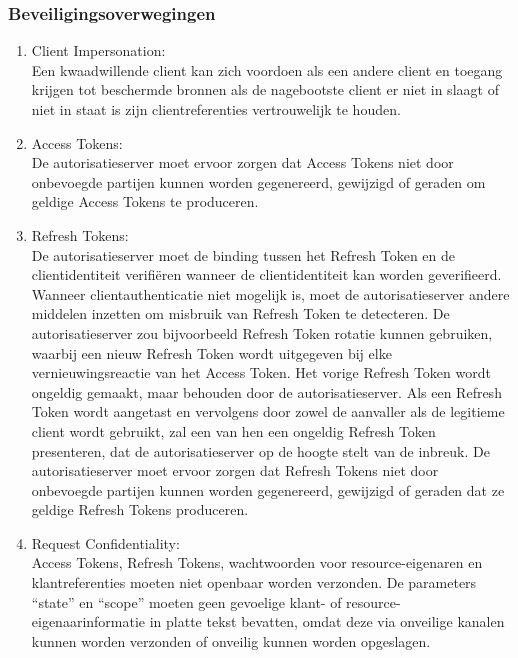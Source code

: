   \subsubsection{Beveiligingsoverwegingen}
  \label{subsubsec:beveiligingsoverwegingen}
  \begin{enumerate}[label=\textbf{-}]
      \item Client Impersonation: \\
      Een kwaadwillende client kan zich voordoen als een andere client en toegang krijgen tot beschermde bronnen als de nagebootste client er niet in slaagt of niet in staat is zijn clientreferenties vertrouwelijk te houden.
  
      \item Access Tokens: \\
      De autorisatieserver moet ervoor zorgen dat Access Tokens niet door onbevoegde partijen kunnen worden gegenereerd, gewijzigd of geraden om geldige Access Tokens te produceren.
  
      \item Refresh Tokens: \\
      De autorisatieserver moet de binding tussen het Refresh Token en de clientidentiteit verifiëren wanneer de clientidentiteit kan worden geverifieerd. Wanneer clientauthenticatie niet mogelijk is, moet de autorisatieserver andere middelen inzetten om misbruik van Refresh Token te detecteren. De autorisatieserver zou bijvoorbeeld Refresh Token rotatie kunnen gebruiken, waarbij een nieuw Refresh Token wordt uitgegeven bij elke vernieuwingsreactie van het Access Token. Het vorige Refresh Token wordt ongeldig gemaakt, maar behouden door de autorisatieserver. Als een Refresh Token wordt aangetast en vervolgens door zowel de aanvaller als de legitieme client wordt gebruikt, zal een van hen een ongeldig Refresh Token presenteren, dat de autorisatieserver op de hoogte stelt van de inbreuk. De autorisatieserver moet ervoor zorgen dat Refresh Tokens niet door onbevoegde partijen kunnen worden gegenereerd, gewijzigd of geraden dat ze geldige Refresh Tokens produceren.
  
      \item Request Confidentiality: \\
      Access Tokens, Refresh Tokens, wachtwoorden voor resource-eigenaren en klantreferenties moeten niet openbaar worden verzonden. De parameters ``state'' en ``scope'' moeten geen gevoelige klant- of resource-eigenaarinformatie in platte tekst bevatten, omdat deze via onveilige kanalen kunnen worden verzonden of onveilig kunnen worden opgeslagen.
  \end{enumerate}


